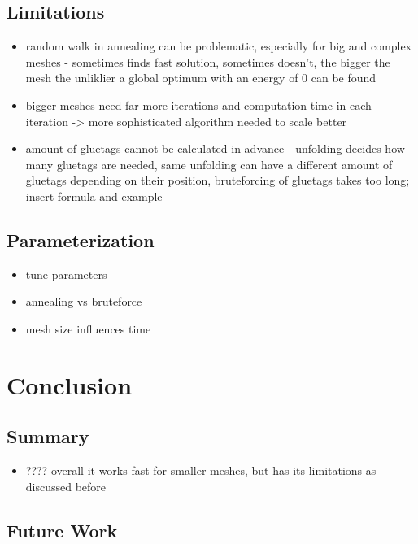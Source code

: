 \documentclass[draft,final]{vutinfth} %
\begin{document}
\section{Limitations}

\begin{itemize}
	\item random walk in annealing can be problematic, especially for big and complex meshes - sometimes finds fast solution, sometimes doesn't, the bigger the mesh the unliklier a global optimum with an energy of 0 can be found
	\item bigger meshes need far more iterations and computation time in each iteration -> more sophisticated algorithm needed to scale better
	\item amount of gluetags cannot be calculated in advance - unfolding decides how many gluetags are needed, same unfolding can have a different amount of gluetags depending on their position, bruteforcing of gluetags takes too long; insert formula and example
\end{itemize}

\section{Parameterization}

\begin{itemize}
	\item tune parameters
	\item annealing vs bruteforce
	\item mesh size influences time
\end{itemize}

\chapter{Conclusion}
\label{chap:conclusion}

\section{Summary}

\begin{itemize}
	\item ???? overall it works fast for smaller meshes, but has its limitations as discussed before
\end{itemize}

\section{Future Work}
\end{document}
